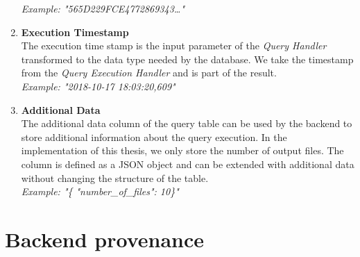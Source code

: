 \documentclass[draft,final]{vutinfth} %
\begin{document}
\begin{enumerate}
	\textit{Example: "565D229FCE4772869343\dots"} 
	\item \textbf{Execution Timestamp} \\
	The execution time stamp is the input parameter of the \textit{Query Handler} transformed to the data type needed by the database. We take the timestamp from the \textit{Query Execution Handler} and is part of the result. \\
	\textit{Example: "2018-10-17 18:03:20,609"}  
	\item \textbf{Additional Data} \\
	The additional data column of the query table can be used by the backend to store additional information about the query execution. In the implementation of this thesis, we only store the number of output files. The column is defined as a JSON object and can be extended with additional data without changing the structure of the table. \\
	\textit{Example: "\{ "number\_of\_files": 10\}"}    	 
\end{enumerate}

\section{Backend provenance}\label{Implementation:Backend provenance}
\end{document}
